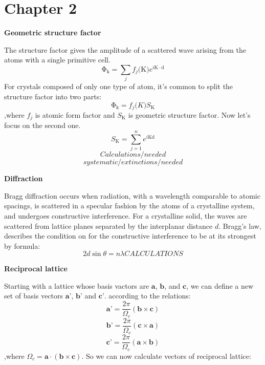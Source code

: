 \section{Chapter 2}

\textbf{Geometric structure factor}

The structure factor gives the amplitude of a scattered wave arising
from the atoms with a single primitive cell. 
\begin{equation}
\mathrm{\Phi_k} = \sum_{j} f_j(\mathrm{K)}e^{i\mathrm{K \cdot d}}
\end{equation}
For crystals composed of only one type of atom, it’s common to split
the structure factor into two parts:
\begin{equation}
\mathrm{\Phi_k} = f_j\mathrm(K)S_{\mathrm{K}}
\end{equation}
,where $f_j$ is atomic form factor and $S_\mathrm{K}$ is geometric structure factor. Now let's focus on the second one.
\begin{equation}
S_\mathrm{K} = \sum_{j = 1}^{n} e^{i \mathrm{Kd}}
\end{equation}
\begin{displaymath}
Calculations/needed
\end{displaymath}
\begin{displaymath}
systematic/extinctions/needed
\end{displaymath}

\textbf{Diffraction}

Bragg diffraction occurs when radiation, with a wavelength comparable to atomic spacings, is scattered in a specular fashion by the atoms of a crystalline system, and undergoes constructive interference. For a crystalline solid, the waves are scattered from lattice planes separated by the interplanar distance $d$. Bragg's law,  describes the condition on for the constructive interference to be at its strongest by formula:
\begin{equation}
2d \sin{\theta} = n \lambda
CALCULATIONS
\end{equation}

\textbf{Reciprocal lattice}

Starting with a lattice whose basis vactors are $\textbf{a}$, $\textbf{b}$, and $\textbf{c}$, we can define a new set of basis vectors $\textbf{a'}$, $\textbf{b'}$ and $\textbf{c'}$. according to the relations:
\begin{equation}
\textbf{a'} = \frac{2 \pi}{\Omega_c} (\textbf{b} \times \textbf{c})
\end{equation}
\begin{equation}
\textbf{b'} = \frac{2 \pi}{\Omega_c} (\textbf{c} \times \textbf{a})
\end{equation}
\begin{equation}
\textbf{c'} = \frac{2 \pi}{\Omega_c} (\textbf{a} \times \textbf{b})
\end{equation}
,where $\Omega_c = \textbf{a} \cdot (\textbf{b} \times \textbf{c})$. So we can now calculate vectors of reciprocal lattice:

